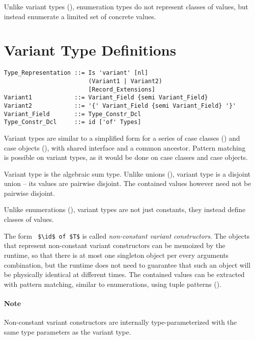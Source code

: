 Unlike variant types (), enumeration types do not represent classes of values, but instead enumerate a limited set of concrete values. 





\section{Variant Type Definitions}
\label{sec:variant-types}

\syntax\begin{lstlisting}
Type_Representation ::= Is 'variant' [nl]
                        (Variant1 | Variant2)
                        [Record_Extensions]
Variant1            ::= Variant_Field {semi Variant_Field}
Variant2            ::= '{' Variant_Field {semi Variant_Field} '}'
Variant_Field       ::= Type_Constr_Dcl
Type_Constr_Dcl     ::= id ['of' Types]
\end{lstlisting}

Variant types are similar to a simplified form for a series of case classes () and case objects (), with shared interface and a common ancestor. Pattern matching is possible on variant types, as it would be done on case classes and case objects. 

Variant type is the algebraic sum type. Unlike unions (), variant type is a disjoint union -- its values are pairwise disjoint. The contained values however need not be pairwise disjoint. 

Unlike enumerations (), variant types are not just constants, they instead define classes of values. 

The form ~\lstinline!$\id$ of $T$! is called {\em non-constant variant constructors}. The objects that represent non-constant variant constructors can be memoized by the runtime, so that there is at most one singleton object per every arguments combination, but the runtime does not need to guarantee that such an object will be physically identical at different times. The contained values can be extracted with pattern matching, similar to enumerations, using tuple patterns (). 

\paragraph{Note}
Non-constant variant constructors are internally type-parameterized with the same type parameters as the variant type. 

